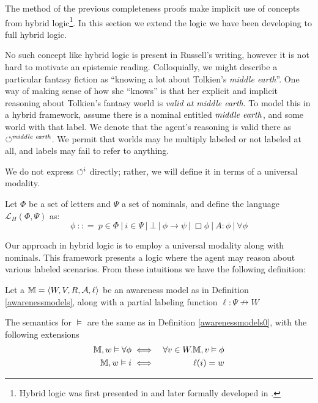The method of the previous completeness proofs make implicit use of concepts from
hybrid logic{\footnote{Hybrid logic was first presented in
{\cite{prior_revised_1969}} and later formally developed in
{\cite{bull_approach_1970}}.}}.  In this section we extend the logic
we have been developing to full hybrid logic.

No such concept like hybrid logic is present in Russell's writing,
however it is not hard to motivate an epistemic reading.
Colloquially, we might describe a particular fantasy fiction
as ``knowing a lot about Tolkien's \emph{middle earth}''.  One way of
making sense of how she ``knows'' is that her explicit and implicit reasoning about
Tolkien's fantasy world is  \emph{valid at middle
  earth}.  To model this in a hybrid framework, assume there is a
nominal entitled $\textup{\emph{middle earth}}$, and some world with
that label. We denote that the agent's reasoning is valid there as $\PP^{\textup{\emph{middle
      earth}}}$. 
We permit that worlds may be multiply labeled or not labeled at
all, and labels may fail to refer to anything.

We do not express $\PP^i$ directly; rather, we will define it in terms
of a universal modality.

\begin{definition}
  Let $\Phi$ be a set of letters and $\Psi$ a set of nominals, and define the
  language $\mathcal{L}_H (\Phi, \Psi)$ as:
  \[ \phi \  : : = \  p \in \Phi \  |
     \  i \in \Psi \  | \  \bot \  |
     \  \phi \rightarrow \psi \  | \  \Box \phi
     \  | \  A : \phi \  | \  \forall
     \phi \]
\end{definition}

Our approach in hybrid logic is to employ a universal modality along with
nominals.  This framework presents a logic where the agent may reason about
various labeled scenarios.    From these intuitions we have the following definition:

\begin{definition}
  \label{hybridsemantics}Let a  $\mathbbm{M}= \langle
  W, V, R, \mathcal{A}, \ell \rangle$ be an awareness model as in Definition
  \ref{awarenessmodels}, along with a partial labeling function $\ell : \Psi
  \nrightarrow W$
  
  The semantics for $\vDash$ are the same as in Definition
  \ref{awarenessmodels0}, with the following extensions
  \begin{eqnarray*}
    \mathbbm{M}, w \vDash \forall \phi & \iff & \forall v \in
    W.\mathbbm{M}, v \vDash \phi\\
    \mathbbm{M}, w \vDash i & \iff & \ell (i) = w
  \end{eqnarray*}
\end{definition}

